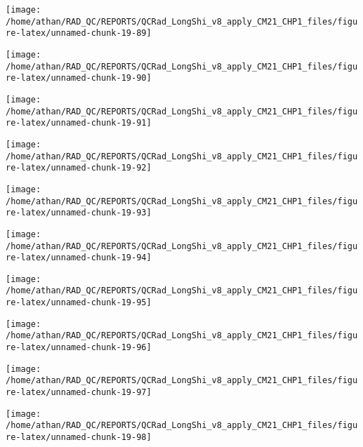 \documentclass[
  10pt,
  a4paper,oneside]{article}
\begin{document}
\begin{center}\texttt{[image: /home/athan/RAD\_QC/REPORTS/QCRad\_LongShi\_v8\_apply\_CM21\_CHP1\_files/figure-latex/unnamed-chunk-19-89]} \end{center}

\begin{center}\texttt{[image: /home/athan/RAD\_QC/REPORTS/QCRad\_LongShi\_v8\_apply\_CM21\_CHP1\_files/figure-latex/unnamed-chunk-19-90]} \end{center}

\begin{center}\texttt{[image: /home/athan/RAD\_QC/REPORTS/QCRad\_LongShi\_v8\_apply\_CM21\_CHP1\_files/figure-latex/unnamed-chunk-19-91]} \end{center}

\begin{center}\texttt{[image: /home/athan/RAD\_QC/REPORTS/QCRad\_LongShi\_v8\_apply\_CM21\_CHP1\_files/figure-latex/unnamed-chunk-19-92]} \end{center}

\begin{center}\texttt{[image: /home/athan/RAD\_QC/REPORTS/QCRad\_LongShi\_v8\_apply\_CM21\_CHP1\_files/figure-latex/unnamed-chunk-19-93]} \end{center}

\begin{center}\texttt{[image: /home/athan/RAD\_QC/REPORTS/QCRad\_LongShi\_v8\_apply\_CM21\_CHP1\_files/figure-latex/unnamed-chunk-19-94]} \end{center}

\begin{center}\texttt{[image: /home/athan/RAD\_QC/REPORTS/QCRad\_LongShi\_v8\_apply\_CM21\_CHP1\_files/figure-latex/unnamed-chunk-19-95]} \end{center}

\begin{center}\texttt{[image: /home/athan/RAD\_QC/REPORTS/QCRad\_LongShi\_v8\_apply\_CM21\_CHP1\_files/figure-latex/unnamed-chunk-19-96]} \end{center}

\begin{center}\texttt{[image: /home/athan/RAD\_QC/REPORTS/QCRad\_LongShi\_v8\_apply\_CM21\_CHP1\_files/figure-latex/unnamed-chunk-19-97]} \end{center}

\begin{center}\texttt{[image: /home/athan/RAD\_QC/REPORTS/QCRad\_LongShi\_v8\_apply\_CM21\_CHP1\_files/figure-latex/unnamed-chunk-19-98]} \end{center}
\end{document}
